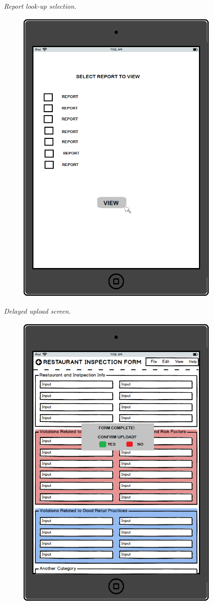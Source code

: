 \documentclass[twoside,letterpaper]{article}
\begin{document}
\newpage
{\itshape\color{black}
Report look-up selection. 
}
\begin{figure}[H]
\centering
\renewcommand{\figurename}{Report_Lookup}
\includegraphics[width=4in,height=6in]{select_report_mockup.png}
\end{figure}

\newpage
{\itshape\color{black}
Delayed upload screen. 
}
\begin{figure}[H]
\centering
\renewcommand{\figurename}{Delayed_upload}
\includegraphics[width=4in,height=6in]{delayed_upload_mockup.png}
\end{figure}
\end{document}
